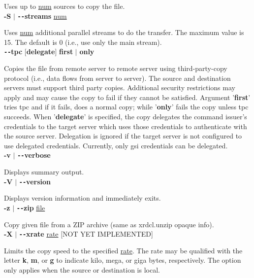\documentclass{article}
\begin{document}
		\noindent Uses up to \underline{num} sources to copy the file. \\
		
		\noindent \textbf{-S} $\vert$ \textbf{\texttt{-{}-}streams} \underline{num}

		\noindent Uses \underline{num} additional parallel streams to do the transfer.
		The maximum value is 15. The default is 0 (i.e., use only the main stream). \\
		
		\noindent \textbf{\texttt{-{}-}tpc} [\textbf{delegate}] \textbf{first} $\vert$ \textbf{only}

		\noindent Copies the file from remote server to remote server using third-party-copy
		protocol (i.e., data flows from server to server). The source and destination
		servers must support third party copies. Additional security restrictions
		may apply and may cause the copy to fail if they cannot be satisfied.
		Argument '\textbf{first}' tries tpc and if it fails, does a normal copy;
		while '\textbf{only}' fails the copy unless tpc succeeds. When '\textbf{delegate}' is
		specified, the copy delegates the command issuer's credentials to the target
		server which uses those credentials to authenticate with the source server.
		Delegation is ignored if the target server is not configured to use delegated
		credentials. Currently, only gsi credentials can be delegated. \\
		
		\noindent \textbf{-v} $\vert$ \textbf{\texttt{-{}-}verbose}

		\noindent Displays summary output. \\
		
		\noindent \textbf{-V} $\vert$ \textbf{\texttt{-{}-}version}

		\noindent Displays version information and immediately exits. \\
		
		\noindent \textbf{-z} $\vert$ \textbf{\texttt{-{}-}zip} \underline{file}

		\noindent Copy given file from a ZIP archive (same as xrdcl.unzip opaque info). \\
		
		\noindent \textbf{-X} $\vert$ \textbf{\texttt{-{}-}xrate} \underline{rate} [NOT YET IMPLEMENTED]
		
		\noindent Limits the copy speed to the specified \underline{rate}. The rate may be qualified
		with the letter \textbf{k}, \textbf{m}, or \textbf{g} to indicate kilo, mega, or giga
		bytes, respectively. The option only applies when the source or destination is
		local. \\
		
\end{document}
